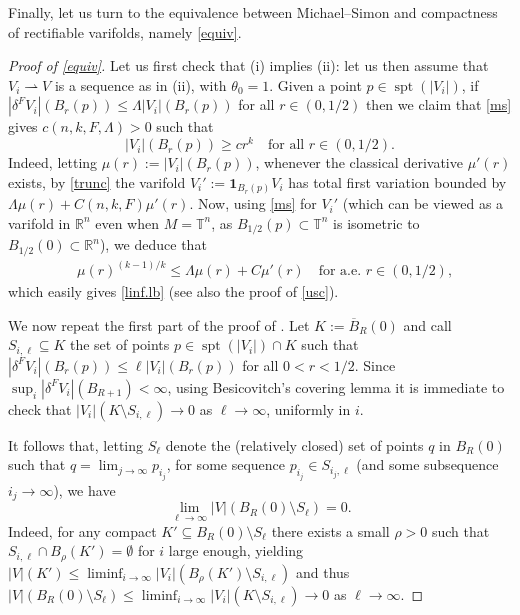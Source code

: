 \documentclass[11pt,a4paper]{amsart}
\newcommand{\R}{\mathbb{R}}
\newcommand{\uno}{\bm{1}}
\renewcommand{\bar}{\overline}
\theoremstyle{definition}
\newcommand{\weakto}{\rightharpoonup}
\begin{document}
Finally, let us turn to the equivalence between Michael--Simon and compactness of rectifiable varifolds,
namely \cref{equiv}.

\begin{proof}[Proof of \cref{equiv}]
    Let us first check that (i) implies (ii): let us then assume that $V_i\weakto V$ is a sequence as in (ii), with $\theta_0=1$. Given a point $p\in\operatorname{spt}(|V_i|)$, if $|\delta^FV_i|(B_r(p))\le\Lambda|V_i|(B_r(p))$ for all $r\in(0,1/2)$ then we claim that \cref{ms} gives $c(n,k,F,\Lambda)>0$ such that
    \begin{equation}\label{linf.lb}
        |V_i|(B_r(p))\ge cr^k\quad\text{for all }r\in(0,1/2).
    \end{equation}
    Indeed, letting $\mu(r):=|V_i|(B_r(p))$,
	whenever the classical derivative $\mu'(r)$ exists, by \cref{trunc} the varifold $V_i':=\uno_{B_r(p)}V_i$ has total first variation bounded by $\Lambda\mu(r)+C(n,k,F)\mu'(r)$.
	Now, using \cref{ms} for $V_i'$ (which can be viewed as a varifold in $\R^n$ even when $M=\mathbb{T}^n$, as $B_{1/2}(p)\subset\mathbb{T}^n$ is isometric to $B_{1/2}(0)\subset\R^n$), we deduce that
	\begin{align*}
		&\mu(r)^{(k-1)/k}\le \Lambda \mu(r)+C\mu'(r)\quad\text{for a.e.\ }r\in(0,1/2),
	\end{align*}
    which easily gives \cref{linf.lb} (see also the proof of \cref{usc}).
    
	We now repeat the first part of the proof of \cite[Theorem 40.6]{Simon}.  Let $K:=\bar B_R(0)$ and call $S_{i,\ell}\subseteq K$ the set of points $p\in \operatorname{spt}(|V_i|)\cap K$ such that $|\delta^F V_i|(B_r(p))\le\ell|V_i|(B_r(p))$ for all $0<r<1/2$.
	Since $\sup_i|\delta^F V_i|(B_{R+1})<\infty$, using Besicovitch's covering lemma it is immediate to check that $|V_i|(K\setminus S_{i,\ell})\to 0$ as $\ell\to\infty$, uniformly in $i$.
	
	It follows that, letting $S_\ell$ denote the (relatively closed) set of points $q$ in $B_R(0)$ such that $q=\lim_{j\to\infty}p_{i_j}$, for some sequence $p_{i_j}\in S_{i_j,\ell}$ (and some subsequence $i_j\to\infty$), we have
	$$\lim_{\ell\to\infty}|V|(B_R(0)\setminus S_\ell)=0.$$
	Indeed, for any compact $K'\subseteq B_R(0)\setminus S_\ell$ there exists a small $\rho>0$ such that
    $S_{i,\ell}\cap B_\rho(K')=\emptyset$ for $i$ large enough, yielding $|V|(K')\le\liminf_{i\to\infty}|V_i|(B_\rho(K')\setminus S_{i,\ell})$ and thus $|V|(B_R(0)\setminus S_\ell)\le\liminf_{i\to\infty}|V_i|(K\setminus S_{i,\ell})\to0$
    as $\ell\to\infty$.
	

\end{proof}
\end{document}
